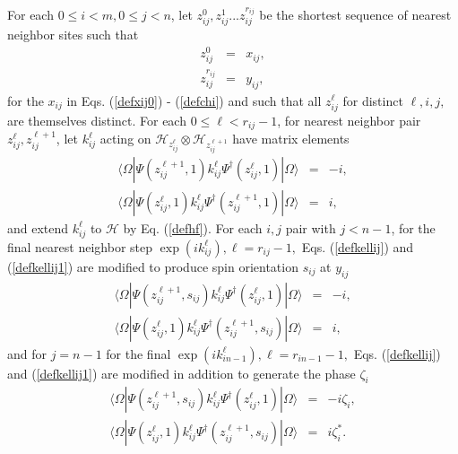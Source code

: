 \documentclass[twocolumn,amsmath,amssymb]{revtex4-1}
\begin{document}
For each $0 \le i < m, 0 \le j < n$, let
$z^0_{ij}, z^1_{ij} ... z^{r_{ij}}_{ij}$ be the shortest
sequence of nearest neighbor sites
such that 
\begin{subequations}
\begin{eqnarray}
\label{z0}
z^0_{ij} & = & x_{ij}, \\
\label{zlast}
z^{r_{ij}}_{ij} & = & y_{ij},
\end{eqnarray}
\end{subequations}
for the $x_{ij}$ in Eqs. (\ref{defxij0}) - (\ref{defchi})
and such that all $z^\ell_{ij}$ for distinct $\ell, i, j,$ are
themselves distinct.
For each $0 \le \ell < r_{ij} -1$, for nearest neighbor pair $z^\ell_{ij}, z^{\ell+1}_{ij}$,
let $k^\ell_{ij}$ acting on $\mathcal{H}_{z^\ell_{ij}} \otimes \mathcal{H}_{z^{\ell+1}_{ij}}$
have matrix elements
\begin{subequations}
\begin{eqnarray}
\label{defkellij}
 \langle  \Omega| \Psi(z^{\ell+1}_{ij} , 1) k^\ell_{ij}  \Psi^{\dagger}(z^\ell_{ij},1)|\Omega \rangle  &=& -i, \\
\label{defkellij1}
 \langle  \Omega| \Psi(z^\ell_{ij},1)  k^\ell_{ij} \Psi^{\dagger}( z^{\ell+1}_{ij},1)|\Omega \rangle  &=& i,
\end{eqnarray}
\end{subequations}
and extend $ k^\ell_{ij}$ to $\mathcal{H}$ by Eq. (\ref{defhf}).
For each $i,j$ pair with $j<n-1$, for  the final nearest neighbor step
$\exp( i k^\ell_{ij}), \ell = r_{ij} - 1,$
Eqs. (\ref{defkellij}) and (\ref{defkellij1})
are modified
to produce spin orientation $s_{ij}$ at $y_{ij}$
\begin{subequations}
\begin{eqnarray}
\label{defkellij2}
 \langle  \Omega| \Psi(z^{\ell+1}_{ij} , s_{ij}) k^\ell_{ij}  \Psi^{\dagger}(z^\ell_{ij},1)|\Omega \rangle  &=& -i, \\
\label{defkellij12}
 \langle  \Omega| \Psi(z^\ell_{ij},1)  k^\ell_{ij} \Psi^{\dagger}( z^{\ell+1}_{ij},s_{ij})|\Omega \rangle  &=& i,
\end{eqnarray}
\end{subequations}
and for $j = n-1$ for
the final $\exp( i k^\ell_{in-1}), \ell = r_{in-1} - 1,$
Eqs. (\ref{defkellij}) and (\ref{defkellij1})
are modified
in addition to generate the phase $\zeta_i$
\begin{subequations}
\begin{eqnarray}
\label{defkellij3}
 \langle  \Omega| \Psi(z^{\ell+1}_{ij} , s_{ij}) k^\ell_{ij}  \Psi^{\dagger}(z^\ell_{ij},1)|\Omega \rangle  &=& -i \zeta_i, \\
\label{defkellij13}
 \langle  \Omega| \Psi(z^\ell_{ij},1)  k^\ell_{ij} \Psi^{\dagger}( z^{\ell+1}_{ij},s_{ij})|\Omega \rangle  &=& i \zeta^*_i.
\end{eqnarray}
\end{subequations}
\end{document}
